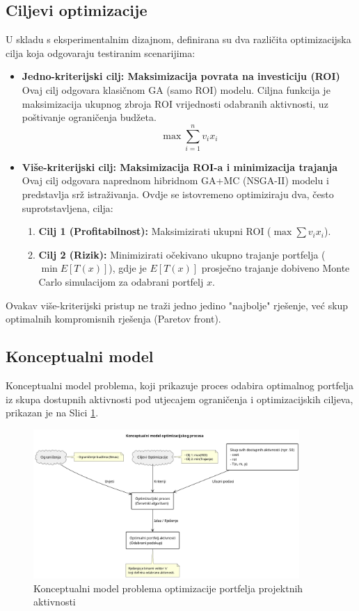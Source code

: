 \subsection{Ciljevi optimizacije}
U skladu s eksperimentalnim dizajnom, definirana su dva različita optimizacijska cilja koja odgovaraju testiranim scenarijima:
\begin{itemize}
    \item \textbf{Jedno-kriterijski cilj: Maksimizacija povrata na investiciju (ROI)}
    Ovaj cilj odgovara klasičnom GA (samo ROI) modelu. Ciljna funkcija je maksimizacija ukupnog zbroja ROI vrijednosti odabranih aktivnosti, uz poštivanje ograničenja budžeta.
    $$ \max \sum_{i=1}^n v_i x_i $$
    \item \textbf{Više-kriterijski cilj: Maksimizacija ROI-a i minimizacija trajanja}
    Ovaj cilj odgovara naprednom hibridnom GA+MC (NSGA-II) modelu i predstavlja srž istraživanja. Ovdje se istovremeno optimiziraju dva, često suprotstavljena, cilja:
    \begin{enumerate}
        \item \textbf{Cilj 1 (Profitabilnost):} Maksimizirati ukupni ROI ($\max \sum v_i x_i$).
        \item \textbf{Cilj 2 (Rizik):} Minimizirati očekivano ukupno trajanje portfelja ($\min E[T(x)]$), gdje je $E[T(x)]$ prosječno trajanje dobiveno Monte Carlo simulacijom za odabrani portfelj $x$.
    \end{enumerate}
\end{itemize}
Ovakav više-kriterijski pristup ne traži jedno jedino "najbolje" rješenje, već skup optimalnih kompromisnih rješenja (Paretov front).

\subsection{Konceptualni model}
Konceptualni model problema, koji prikazuje proces odabira optimalnog portfelja iz skupa dostupnih aktivnosti pod utjecajem ograničenja i optimizacijskih ciljeva, prikazan je na Slici \ref{fig:konceptualni_model}.

\begin{figure}[h!]
    \centering
    \includegraphics[width=0.9\textwidth]{slike/model_problema.png}
    \caption{Konceptualni model problema optimizacije portfelja projektnih aktivnosti}
    \label{fig:konceptualni_model}
\end{figure}

